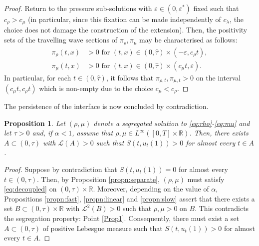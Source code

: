\documentclass[a4paper,twosided, 11pt]{article}
\newcommand{\R}{\mathbb{R}}
\newcommand {\e}  {\varepsilon}
\theoremstyle{plain}
\newtheorem{proposition}[thm]{Proposition}
\theoremstyle{remark}
\numberwithin{equation}{section}
\begin{document}
\begin{proof}
\medskip 

Return to the pressure sub-solutions with $\e \in (0,\e^\ast)$ fixed such that $c_\rho > c_\mu$ (in particular, since this fixation can be made independently of $c_\lambda$, the choice does not damage the construction of the extension). 
Then, the positivity sets of the travelling wave sections of $\pi_\rho,\pi_\mu$ may be characterised as follows: 
\begin{align*}
    \pi_\rho(t,x) & > 0 \text{ for } (t,x) \in (0,\hat{\tau}) \times (-\e,c_\rho t), \\ 
    \pi_\mu(t,x) & > 0 \text{ for } (t,x) \in (0,\hat{\tau}) \times ( c_\mu t,\e).
\end{align*}
In particular, for each $ t\in (0, \hat{\tau})$, it follows that $\pi_{\rho,t},\pi_{\mu,t} > 0 $ on the interval $(c_\mu t, c_\rho  t)$ which is non-empty due to the choice $c_\mu < c_\rho$.
\end{proof}

The persistence of the interface is now concluded by contradiction. 

\begin{proposition}\label{propn:contradiction}
    Let $(\rho,\mu)$ denote a segregated solution to \eqref{eq:rho}-\eqref{eq:mu} and let $\tau > 0$ and, if $\alpha < 1$, assume that $\rho,\mu \in L^\infty([0,T]\times \R)$. 
    Then, there exists $A \subset (0,\tau)$ with $\mathscr{L}(A) > 0$ such that  
    $S(t, u_t(1)) > 0$
     for almost every $t \in A$.
\end{proposition}
\begin{proof}
    Suppose by contradiction that $S(t, u_t(1)) = 0$ for almost every $t \in (0,\tau)$.
    Then, by Proposition \ref{propn:separate}, $(\rho,\mu)$ must satisfy \eqref{eq:decoupled} on $(0,\tau)\times\R$. 
    Moreover, depending on the value of $\alpha$, Propositions \ref{propn:fast}, \ref{propn:linear} and \ref{propn:slow} assert that there exists a set $B \subset (0,\tau)\times \R$ with $\mathscr{L}^2(B) > 0$ such that $\rho,\mu > 0$ on $B$.
    This contradicts the segregation property: Point \ref{Prop1}. 
    Consequently, there must exist a set $A \subset (0,\tau)$ of positive Lebesgue measure such that $S(t, u_t(1)) > 0$ for almost every $t \in A$.
\end{proof}

\end{document}
